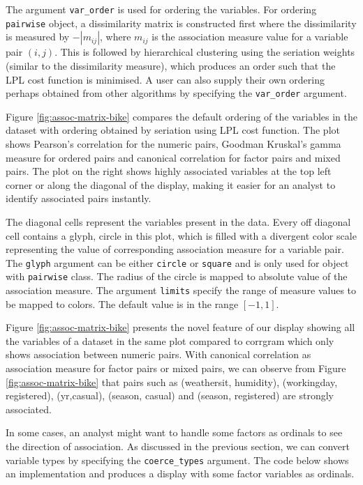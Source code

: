 The argument \texttt{var\_order} is used for ordering the variables. For ordering \texttt{pairwise} object, a dissimilarity matrix is constructed first where the dissimilarity is measured by \(-|m_{ij}|\), where \(m_{ij}\) is the association measure value for a variable pair \((i,j)\). This is followed by hierarchical clustering using the seriation weights (similar to the dissimilarity measure), which produces an order such that the LPL cost function is minimised. A user can also supply their own ordering perhaps obtained from other algorithms by specifying the \texttt{var\_order} argument.

Figure \ref{fig:assoc-matrix-bike} compares the default ordering of the variables in the dataset with ordering obtained by seriation using LPL cost function. The plot shows Pearson's correlation for the numeric pairs, Goodman Kruskal's gamma measure for ordered pairs and canonical correlation for factor pairs and mixed pairs. The plot on the right shows highly associated variables at the top left corner or along the diagonal of the display, making it easier for an analyst to identify associated pairs instantly.

The diagonal cells represent the variables present in the data. Every off diagonal cell contains a glyph, circle in this plot, which is filled with a divergent color scale representing the value of corresponding association measure for a variable pair. The \texttt{glyph} argument can be either \texttt{circle} or \texttt{square} and is only used for object with \texttt{pairwise} class. The radius of the circle is mapped to absolute value of the association measure. The argument \texttt{limits} specify the range of measure values to be mapped to colors. The default value is in the range \([-1,1]\).

Figure \ref{fig:assoc-matrix-bike} presents the novel feature of our display showing all the variables of a dataset in the same plot compared to corrgram which only shows association between numeric pairs. With canonical correlation as association measure for factor pairs or mixed pairs, we can observe from Figure \ref{fig:assoc-matrix-bike} that pairs such as (weathersit, humidity), (workingday, registered), (yr,casual), (season, casual) and (season, registered) are strongly associated.

In some cases, an analyst might want to handle some factors as ordinals to see the direction of association. As discussed in the previous section, we can convert variable types by specifying the \texttt{coerce\_types} argument. The code below shows an implementation and produces a display with some factor variables as ordinals.

